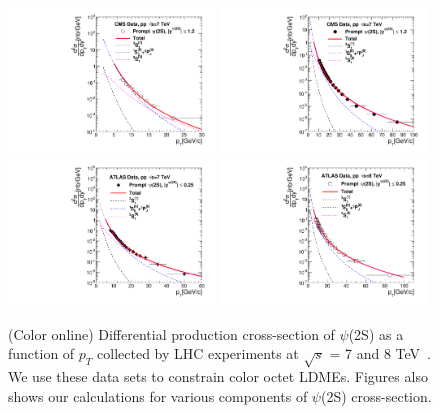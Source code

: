 \documentclass[aps,prc,preprint,superscriptaddress,showpacs,showkeys,amsmath]{revtex4-1}
\begin{document}
\begin{figure}
\includegraphics[width=0.49\textwidth]{Figures/Psi2S/Psi2S_CMS_LowPt.pdf}
\includegraphics[width=0.49\textwidth]{Figures/Psi2S/Psi2S_CMS_HighPt.pdf}
\includegraphics[width=0.49\textwidth]{Figures/Psi2S/Psi2S_ATLAS.pdf}
\includegraphics[width=0.49\textwidth]{Figures/Psi2S/Psi2S_ATLAS_8TeV.pdf}
\caption{(Color online) Differential production cross-section of $\psi$(2S) as a function of $p_{T}$ 
collected by LHC experiments at $\sqrt{s}$ = 7 and 8 TeV~\cite{Chatrchyan:2011kc,Khachatryan:2015rra,Aad:2015duc}. 
We use these data sets to constrain color octet LDMEs. Figures also shows our calculations for various components 
of $\psi$(2S) cross-section.}
\label{Fig:LDMEPsi2S}
\end{figure}
\end{document}
